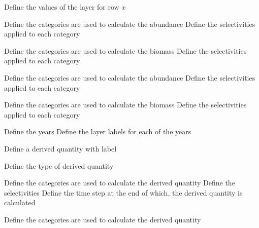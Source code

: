  {Define the values of the layer for row $x$}
\par\textbf{}\par
\par\textbf{}\par
{} {Define the categories are used to calculate the abundance}
 {Define the selectivities applied to each category}
\par\textbf{}\par
{} {Define the categories are used to calculate the biomass}
 {Define the selectivities applied to each category}
\par\textbf{}\par
{} {Define the categories are used to calculate the abundance}
 {Define the selectivities applied to each category}
\par\textbf{}\par
{} {Define the categories are used to calculate the biomass}
 {Define the selectivities applied to each category}
\par\textbf{}\par
{} {Define the years}
 {Define the layer labels for each of the years}
\par {} {Define a derived quantity with label}\par
{} {Define the type of derived quantity}
\par\textbf{}\par
{} {Define the categories are used to calculate the derived quantity}
 {Define the selectivities}
 {Define the time step at the end of which, the derived quantity is calculated}
\par\textbf{}\par
{} {Define the categories are used to calculate the derived quantity}
